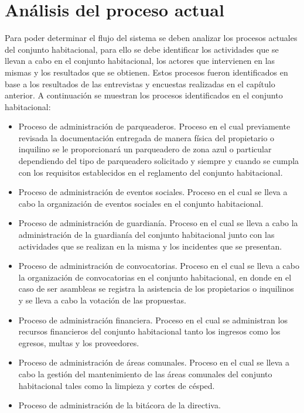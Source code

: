 \section{Análisis del proceso actual}\label{sec:analisis-proceso-actual}

Para poder determinar el flujo del sistema se deben analizar los procesos actuales del conjunto habitacional, para ello se debe identificar los actividades que se llevan a cabo en el conjunto habitacional, los actores que intervienen en las mismas y los resultados que se obtienen.
Estos procesos fueron identificados en base a los resultados de las entrevistas y encuestas realizadas en el capítulo anterior.
\bigbreak
A continuación se muestran los procesos identificados en el conjunto habitacional:
\begin{itemize}
    \item Proceso de administración de parqueaderos.
    Proceso en el cual previamente revisada la documentación entregada de manera física del propietario o inquilino se le proporcionará un parqueadero de zona azul o particular dependiendo del tipo de parqueadero solicitado y siempre y cuando se cumpla con los requisitos establecidos en el reglamento del conjunto habitacional.
    \item Proceso de administración de eventos sociales.
    Proceso en el cual se lleva a cabo la organización de eventos sociales en el conjunto habitacional.
    \item Proceso de administración de guardianía.
    Proceso en el cual se lleva a cabo la administración de la guardianía del conjunto habitacional junto con las actividades que se realizan en la misma y los incidentes que se presentan.
    \item Proceso de administración de convocatorias.
    Proceso en el cual se lleva a cabo la organización de convocatorias en el conjunto habitacional, en donde en el caso de ser asambleas se registra la asistencia de los propietarios o inquilinos y se lleva a cabo la votación de las propuestas.
    \item Proceso de administración financiera.
    Proceso en el cual se administran los recursos financieros del conjunto habitacional tanto los ingresos como los egresos, multas y los proveedores.
    \item Proceso de administración de áreas comunales.
    Proceso en el cual se lleva a cabo la gestión del mantenimiento de las áreas comunales del conjunto habitacional tales como la limpieza y cortes de césped.
    \item Proceso de administración de la bitácora de la directiva.

\end{itemize}
